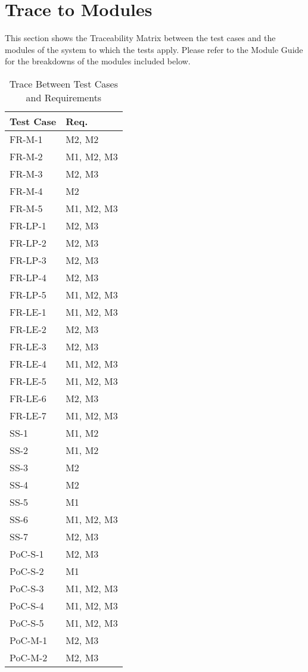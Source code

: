 \documentclass[12pt, titlepage]{article}
\begin{document}
\newpage

		
\section{Trace to Modules}	
This section shows the Traceability Matrix between the test cases and the modules of the system to which the tests apply. Please refer to the Module Guide for the breakdowns of the modules included below.
\begin{table}[H]
\centering
\begin{tabular}{p{} p{}}
\toprule
\textbf{Test Case} & \textbf{Req.}\\
\midrule
FR-M-1 & M2, M2\\
FR-M-2 & M1, M2, M3\\
FR-M-3 & M2, M3\\
FR-M-4 & M2\\
FR-M-5 & M1, M2, M3\\
FR-LP-1 & M2, M3\\
FR-LP-2 & M2, M3 \\
FR-LP-3 & M2, M3 \\
FR-LP-4 & M2, M3 \\
FR-LP-5 & M1, M2, M3 \\
FR-LE-1 & M1, M2, M3 \\
FR-LE-2 & M2, M3 \\
FR-LE-3 & M2, M3 \\
FR-LE-4 & M1, M2, M3 \\
FR-LE-5 & M1, M2, M3 \\
FR-LE-6 & M2, M3 \\ 
FR-LE-7 & M1, M2, M3 \\
SS-1 & M1, M2 \\
SS-2 & M1, M2 \\
SS-3 & M2 \\
SS-4 & M2 \\
SS-5 & M1 \\
SS-6 & M1, M2, M3 \\
SS-7 & M2, M3 \\
PoC-S-1 & M2, M3 \\
PoC-S-2 & M1 \\
PoC-S-3 & M1, M2, M3 \\
PoC-S-4 & M1, M2, M3 \\
PoC-S-5 & M1, M2, M3 \\
PoC-M-1 & M2, M3 \\
PoC-M-2 & M2, M3 \\
\bottomrule
\end{tabular}
\caption{Trace Between Test Cases and Requirements}
\label{TblRT}
\end{table}
\end{document}
